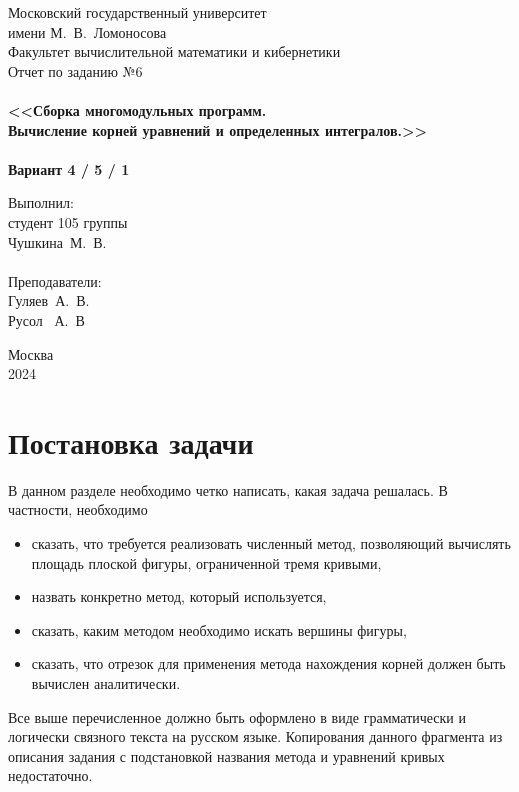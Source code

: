 \documentclass[a4paper,12pt,titlepage,finall]{article}
\begin{document}
\begin{titlepage}
    \begin{center}
	{\small \sc Московский государственный университет \\имени М.~В.~Ломоносова\\
	Факультет вычислительной математики и кибернетики\\}
	\vfill
	{\Large \sc Отчет по заданию №6}\\
	~\\
	{\large \bf <<Сборка многомодульных программ. \\
	Вычисление корней уравнений и определенных интегралов.>>}\\ 
	~\\
	{\large \bf Вариант 4 / 5 / 1}
    \end{center}
    \begin{flushright}
	\vfill {Выполнил:\\
	студент 105 группы\\
	Чушкина~М.~В.\\
	~\\
	Преподаватели:\\
	Гуляев~А.~В.\\
	Русол ~А.~В}
    \end{flushright}
    \begin{center}
	\vfill
	{\small Москва\\2024}
    \end{center}
\end{titlepage}

\tableofcontents
\newpage

\section{Постановка задачи}

В данном разделе необходимо четко написать, какая задача решалась. В частности, необходимо
\begin{itemize}
\item сказать, что требуется реализовать численный метод, позволяющий вычислять площадь плоской фигуры,
	ограниченной тремя кривыми,
\item назвать конкретно метод, который используется,
\item сказать, каким методом необходимо искать вершины фигуры,
\item сказать, что отрезок для применения метода нахождения корней должен быть вычислен аналитически.
\end{itemize}
Все выше перечисленное должно быть оформлено в виде грамматически и логически
связного текста на русском языке. Копирования данного фрагмента из описания задания 
с подстановкой названия метода и уравнений кривых недостаточно.
\end{document}
